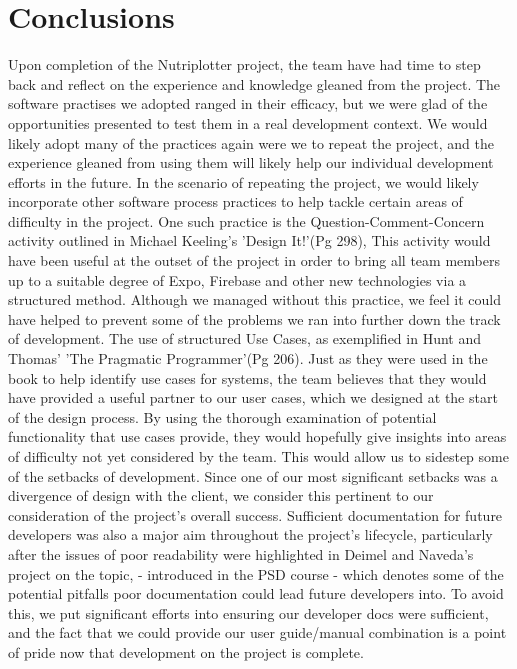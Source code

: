 \documentclass{l3proj}
\begin{document}
\section{Conclusions}
Upon completion of the Nutriplotter project, the team have had time to step back and reflect on the experience and knowledge gleaned from the project. The software practises we adopted ranged in their efficacy, but we were glad of the opportunities presented to test them in a real development context. We would likely adopt many of the practices again were we to repeat the project, and the experience gleaned from using them will likely help our individual development efforts in the future. In the scenario of repeating the project, we would likely incorporate other software process practices to help tackle certain areas of difficulty in the project. One such practice is the Question-Comment-Concern activity outlined in Michael Keeling's 'Design It!'\cite{Book:design_it}(Pg 298), This activity would have been useful at the outset of the project in order to bring all team members up to a suitable degree of Expo, Firebase and other new technologies via a structured method. Although we managed without this practice, we feel it could have helped to prevent some of the problems we ran into further down the track of development. The use of structured Use Cases, as exemplified in Hunt and Thomas' 'The Pragmatic Programmer'\cite{Book:pragprog}(Pg 206). Just as they were used in the book to help identify use cases for systems, the team believes that they would have provided a useful partner to our user cases, which we designed at the start of the design process. By using the thorough examination of potential functionality that use cases provide, they would hopefully give insights into areas of difficulty not yet considered by the team. This would allow us to sidestep some of the setbacks of development. Since one of our most significant setbacks was a divergence of design with the client, we consider this pertinent to our consideration of the project's overall success. Sufficient documentation for future developers was also a major aim throughout the project's lifecycle, particularly after the issues of poor readability were highlighted in Deimel and Naveda's project on the topic\cite{Book:deimel}, - introduced in the PSD course - which denotes some of the potential pitfalls poor documentation could lead future developers into. To avoid this, we put significant efforts into ensuring our developer docs were sufficient, and the fact that we could provide our user guide/manual combination is a point of pride now that development on the project is complete.\par 
\end{document}
